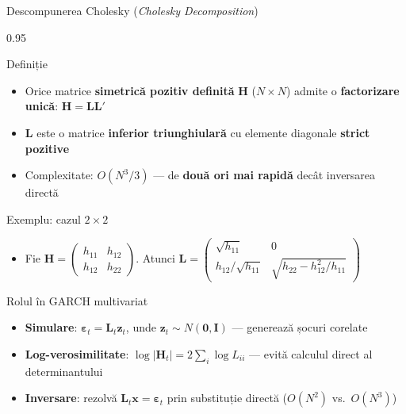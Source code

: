 \documentclass[9pt, aspectratio=169, t]{beamer}
\begin{document}
\begin{frame}{Descompunerea Cholesky (\textit{Cholesky Decomposition})}
    \begin{cminipage}{0.95\textwidth}
    \vspace{-2mm}
    {\scriptsize
    \begin{block}{Definiție}
        \begin{itemize}\setlength{\itemsep}{0pt}
            \item Orice matrice \textbf{simetrică pozitiv definită} $\mathbf{H}$ ($N \times N$) admite o \textbf{factorizare unică}: $\mathbf{H} = \mathbf{L}\mathbf{L}'$
            \item $\mathbf{L}$ este o matrice \textbf{inferior triunghiulară} cu elemente diagonale \textbf{strict pozitive}
            \item Complexitate: $O(N^3/3)$ --- de \textbf{două ori mai rapidă} decât inversarea directă
        \end{itemize}
    \end{block}
    \vspace{-1mm}
    \begin{block}{Exemplu: cazul $2 \times 2$}
        \begin{itemize}\setlength{\itemsep}{0pt}
            \item Fie $\mathbf{H} = \begin{pmatrix} h_{11} & h_{12} \\ h_{12} & h_{22} \end{pmatrix}$. Atunci $\mathbf{L} = \begin{pmatrix} \sqrt{h_{11}} & 0 \\ h_{12}/\sqrt{h_{11}} & \sqrt{h_{22} - h_{12}^2/h_{11}} \end{pmatrix}$
        \end{itemize}
    \end{block}
    \vspace{-1mm}
    \begin{alertblock}{Rolul în GARCH multivariat}
        \begin{itemize}\setlength{\itemsep}{0pt}
            \item \textbf{Simulare}: $\boldsymbol{\varepsilon}_t = \mathbf{L}_t \mathbf{z}_t$, unde $\mathbf{z}_t \sim N(\mathbf{0}, \mathbf{I})$ --- generează șocuri corelate
            \item \textbf{Log-verosimilitate}: $\log|\mathbf{H}_t| = 2\sum_i \log L_{ii}$ --- evită calculul direct al determinantului
            \item \textbf{Inversare}: rezolvă $\mathbf{L}_t \mathbf{x} = \boldsymbol{\varepsilon}_t$ prin substituție directă ($O(N^2)$ vs.\ $O(N^3)$)
        \end{itemize}
    \end{alertblock}
    }
    \end{cminipage}
\end{frame}
\end{document}
